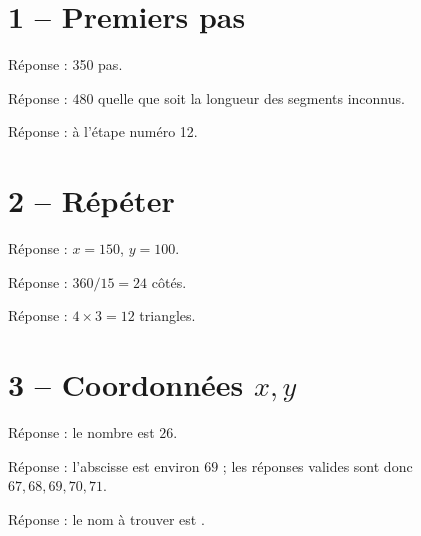 \documentclass[class=report,crop=false, 12pt]{standalone}
\begin{document}


\section*{1 -- Premiers pas}

\begin{enigme}
Réponse : 350 pas.
\end{enigme}

\begin{enigme}
Réponse : $480$ quelle que soit la longueur des segments inconnus.
\end{enigme}

\begin{enigme}
Réponse : à l'étape numéro 12.
\end{enigme}


\section*{2 -- Répéter}

\setcounter{enigme}{0}

\begin{enigme}
Réponse : $x=150$, $y = 100$.
\end{enigme}

\begin{enigme}
Réponse : $360/15 = 24$ côtés.
\end{enigme}

\begin{enigme}
Réponse : $4 \times 3 = 12$ triangles.
\end{enigme}


\section*{3 -- Coordonnées $x,y$}

\setcounter{enigme}{0}

\begin{enigme}
Réponse : le nombre est $26$.
\end{enigme}

\begin{enigme}
Réponse : l'abscisse est environ $69$ ; les réponses valides sont donc $67,68,69,70,71$.
\end{enigme}

\begin{enigme}
Réponse : le nom à trouver est .
\end{enigme}
\end{document}
